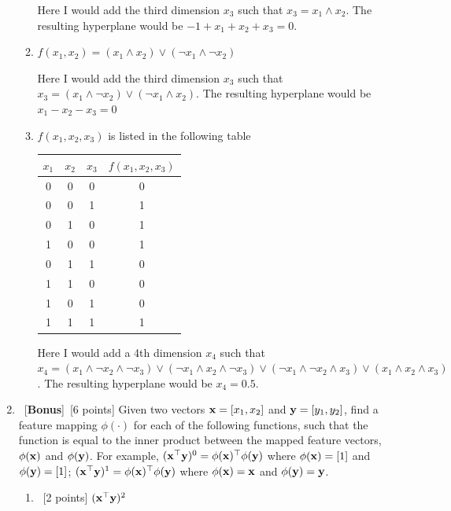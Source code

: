 \documentclass[12pt, fullpage,letterpaper]{article}
\begin{document}
\begin{enumerate}
\begin{enumerate}
		Here I would add the third dimension $x_3$ such that $x_3 = x_1 \land x_2$. The resulting hyperplane would be $-1 + x_1 + x_2 + x_3 = 0$.
		
		\item $f(x_1, x_2) = (x_1 \land x_2) \lor (\neg x_1 \land \neg x_2)$
		
		Here I would add the third dimension $x_3$ such that $x_3 = (x_1 \land \neg x_2) \lor (\neg x_1 \land x_2)$. The resulting hyperplane would be $x_1 - x_2 - x_3 = 0$
		
		\item $f(x_1, x_2, x_3)$ is listed in the following table
		\begin{table}[h]
			\centering
			\begin{tabular}{ccc|c}
				$x_1$ & $x_2$ & $x_3$ &  $f(x_1, x_2, x_3)$\\ 
				\hline\hline
				0 & 0 & 0 & 0 \\ \hline
				0 & 0 & 1 & 1 \\ \hline
				0 & 1 & 0 & 1 \\ \hline
				1 & 0 & 0 & 1 \\ \hline
				0 & 1 & 1 & 0\\ \hline
				1 & 1 & 0 & 0\\ \hline
				1 & 0 & 1 & 0\\ \hline
				1 & 1 & 1 & 1\\ \hline
			\end{tabular}
		\end{table}
	
	Here I would add a 4th dimension $x_4$ such that $x_4 = (x_1 \land \neg x_2 \land \neg x_3) \lor (\neg x_1 \land x_2 \land \neg x_3) \lor (\neg x_1 \land \neg x_2 \land x_3) \lor (x_1 \land x_2 \land x_3)$. The resulting hyperplane would be $x_4 = 0.5$.
	
	\end{enumerate}
	
	\item~[\textbf{Bonus}]~[6 points]  Given two vectors ${\bf x} = [x_1,  x_2]$ and ${\bf y}=[y_1,  y_2]$, find a feature mapping $\phi(\cdot)$ for each of the following functions, such that the function is equal to the inner product between the mapped feature vectors, $\phi({\bf x})$ and $\phi({\bf y})$. For example, $({\bf x}^\top {\bf y})^0 = \phi({\bf x})^\top \phi({\bf y})$ where $\phi({\bf x}) = [1]$ and $\phi({\bf y}) = [1]$; $({\bf x}^\top {\bf y})^1 = \phi({\bf x})^\top \phi({\bf y})$ where $\phi({\bf x}) = {\bf x}$ and $\phi({\bf y}) = {\bf y}$. 
	\begin{enumerate}
		\item~[2 points] $({\bf x}^\top {\bf y})^2$
		

\end{enumerate}
\end{enumerate}
\end{document}
